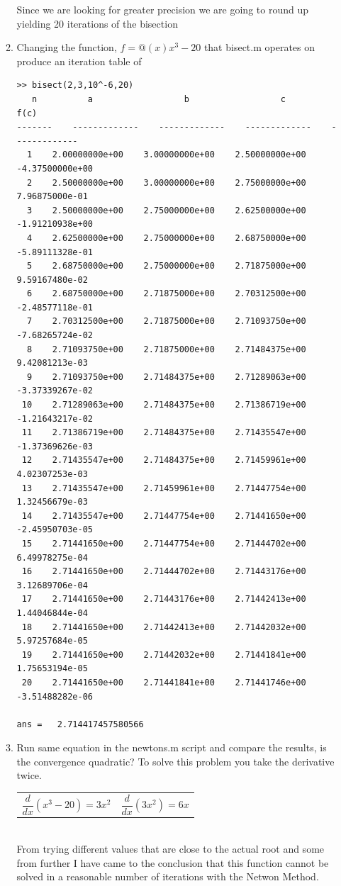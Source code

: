 \documentclass{article}
\begin{document}
\begin{enumerate}
\begin{mdframed}[style=MyFrame]
\begin{enumerate}
Since we are looking for greater precision we are going to round up yielding 20 iterations of the bisection
\newpage\item Changing the function, $f = @(x) x^3 - 20$ that bisect.m operates on produce an iteration table of 
\begin{verbatim}
>> bisect(2,3,10^-6,20)
   n          a                  b                  c                   f(c)
-------    -------------    -------------    -------------    -------------
  1    2.00000000e+00    3.00000000e+00    2.50000000e+00    -4.37500000e+00
  2    2.50000000e+00    3.00000000e+00    2.75000000e+00    7.96875000e-01
  3    2.50000000e+00    2.75000000e+00    2.62500000e+00    -1.91210938e+00
  4    2.62500000e+00    2.75000000e+00    2.68750000e+00    -5.89111328e-01
  5    2.68750000e+00    2.75000000e+00    2.71875000e+00    9.59167480e-02
  6    2.68750000e+00    2.71875000e+00    2.70312500e+00    -2.48577118e-01
  7    2.70312500e+00    2.71875000e+00    2.71093750e+00    -7.68265724e-02
  8    2.71093750e+00    2.71875000e+00    2.71484375e+00    9.42081213e-03
  9    2.71093750e+00    2.71484375e+00    2.71289063e+00    -3.37339267e-02
 10    2.71289063e+00    2.71484375e+00    2.71386719e+00    -1.21643217e-02
 11    2.71386719e+00    2.71484375e+00    2.71435547e+00    -1.37369626e-03
 12    2.71435547e+00    2.71484375e+00    2.71459961e+00    4.02307253e-03
 13    2.71435547e+00    2.71459961e+00    2.71447754e+00    1.32456679e-03
 14    2.71435547e+00    2.71447754e+00    2.71441650e+00    -2.45950703e-05
 15    2.71441650e+00    2.71447754e+00    2.71444702e+00    6.49978275e-04
 16    2.71441650e+00    2.71444702e+00    2.71443176e+00    3.12689706e-04
 17    2.71441650e+00    2.71443176e+00    2.71442413e+00    1.44046844e-04
 18    2.71441650e+00    2.71442413e+00    2.71442032e+00    5.97257684e-05
 19    2.71441650e+00    2.71442032e+00    2.71441841e+00    1.75653194e-05
 20    2.71441650e+00    2.71441841e+00    2.71441746e+00    -3.51488282e-06

ans =   2.714417457580566
\end{verbatim}

\item Run same equation in the newtons.m script and compare the results, is the convergence quadratic? To solve this problem you take the derivative twice. \\
\begin{tabular}{p{6cm} p{6cm}}
\begin{equation}
\frac{d}{dx}(x^3 - 20) = 3x^2
\end{equation} 
&
\begin{equation}
\frac{d}{dx} (3x^2) = 6x
\end{equation}
\end{tabular}\\
From trying different values that are close to the actual root and some from further I have came to the conclusion that this function cannot be solved in a reasonable number of iterations with the Netwon Method. 
\end{enumerate}
\end{mdframed}


\end{enumerate}
\end{document}
